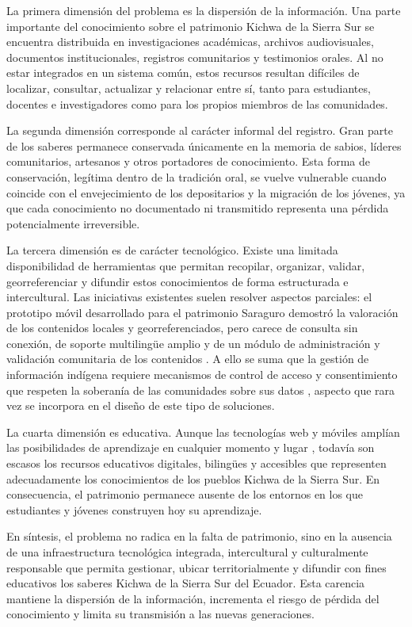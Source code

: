 La primera dimensión del problema es la dispersión de la información. Una parte importante del conocimiento sobre el patrimonio Kichwa de la Sierra Sur se encuentra distribuida en investigaciones académicas, archivos audiovisuales, documentos institucionales, registros comunitarios y testimonios orales. Al no estar integrados en un sistema común, estos recursos resultan difíciles de localizar, consultar, actualizar y relacionar entre sí, tanto para estudiantes, docentes e investigadores como para los propios miembros de las comunidades.

La segunda dimensión corresponde al carácter informal del registro. Gran parte de los saberes permanece conservada únicamente en la memoria de sabios, líderes comunitarios, artesanos y otros portadores de conocimiento. Esta forma de conservación, legítima dentro de la tradición oral, se vuelve vulnerable cuando coincide con el envejecimiento de los depositarios y la migración de los jóvenes, ya que cada conocimiento no documentado ni transmitido representa una pérdida potencialmente irreversible.

La tercera dimensión es de carácter tecnológico. Existe una limitada disponibilidad de herramientas que permitan recopilar, organizar, validar, georreferenciar y difundir estos conocimientos de forma estructurada e intercultural. Las iniciativas existentes suelen resolver aspectos parciales: el prototipo móvil desarrollado para el patrimonio Saraguro demostró la valoración de los contenidos locales y georreferenciados, pero carece de consulta sin conexión, de soporte multilingüe amplio y de un módulo de administración y validación comunitaria de los contenidos \cite{quezada2026mobile}. A ello se suma que la gestión de información indígena requiere mecanismos de control de acceso y consentimiento que respeten la soberanía de las comunidades sobre sus datos \cite{kukutai2016indigenous,hudson2023indigenous}, aspecto que rara vez se incorpora en el diseño de este tipo de soluciones.

La cuarta dimensión es educativa. Aunque las tecnologías web y móviles amplían las posibilidades de aprendizaje en cualquier momento y lugar \cite{sarrab2012mobile}, todavía son escasos los recursos educativos digitales, bilingües y accesibles que representen adecuadamente los conocimientos de los pueblos Kichwa de la Sierra Sur. En consecuencia, el patrimonio permanece ausente de los entornos en los que estudiantes y jóvenes construyen hoy su aprendizaje.

En síntesis, el problema no radica en la falta de patrimonio, sino en la ausencia de una infraestructura tecnológica integrada, intercultural y culturalmente responsable que permita gestionar, ubicar territorialmente y difundir con fines educativos los saberes Kichwa de la Sierra Sur del Ecuador. Esta carencia mantiene la dispersión de la información, incrementa el riesgo de pérdida del conocimiento y limita su transmisión a las nuevas generaciones.

